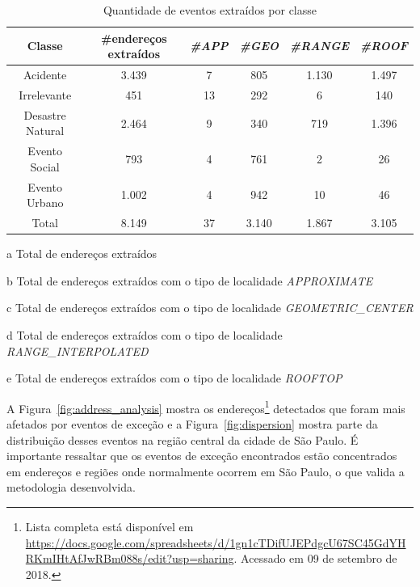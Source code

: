 \documentclass[
	12pt,				%
	oneside,			%
	a4paper,			%
	english,			%
	brazil				%
	]{abntex2ppgsi}
\begin{document}
{{{\begin{table}[!htb]
\centering
\caption {Quantidade de eventos extraídos por classe}
\label {tab:qtdExtractedAddresses}
\begin{threeparttable}
\begin{tabular}{c|c|c|c|c|c}
\toprule
\textbf{Classe} & \textbf{\#endereços extraídos\tnote{a}} & \textbf{\textit{\#APP\tnote{b}}} & \textbf{\textit{\#GEO\tnote{c}}} & \textbf{\textit{\#RANGE\tnote{d}}} & \textbf{\textit{\#ROOF\tnote{e}}} \\
\midrule
Acidente & 3.439 & 7 & 805 & 1.130 & 1.497 \\
\hline
Irrelevante & 451 & 13 & 292 & 6 & 140 \\
\hline
Desastre Natural & 2.464 & 9 & 340 & 719 & 1.396 \\
\hline
Evento Social & 793 & 4 & 761 & 2 & 26 \\
\hline
Evento Urbano & 1.002 & 4 & 942 & 10 & 46 \\
\midrule
\midrule
Total & 8.149 & 37 & 3.140 & 1.867 & 3.105 \\
\bottomrule
\end{tabular}
\begin{tablenotes}
\item[a] Total de endereços extraídos
\item[b] Total de endereços extraídos com o tipo de localidade \textit{APPROXIMATE}
\item[c] Total de endereços extraídos com o tipo de localidade \textit{GEOMETRIC\_CENTER}
\item[d] Total de endereços extraídos com o tipo de localidade \textit{RANGE\_INTERPOLATED}
\item[e] Total de endereços extraídos com o tipo de localidade \textit{ROOFTOP}
\end{tablenotes}
\end{threeparttable}
\end{table}


A Figura~\ref{fig:address_analysis} mostra os endereços\footnote{Lista completa está disponível em \url{https://docs.google.com/spreadsheets/d/1gn1cTDifUJEPdgcU67SC45GdYHRKmIHtAfJwRBm088s/edit?usp=sharing}. Acessado em 09 de setembro de 2018.} detectados que foram mais afetados por eventos de exceção e a Figura~\ref{fig:dispersion} mostra parte da distribuição desses eventos na região central da cidade de São Paulo. É importante ressaltar que os eventos de exceção encontrados estão concentrados em endereços e regiões onde normalmente ocorrem em São Paulo,  o que valida a metodologia desenvolvida. 

}}}
\end{document}
